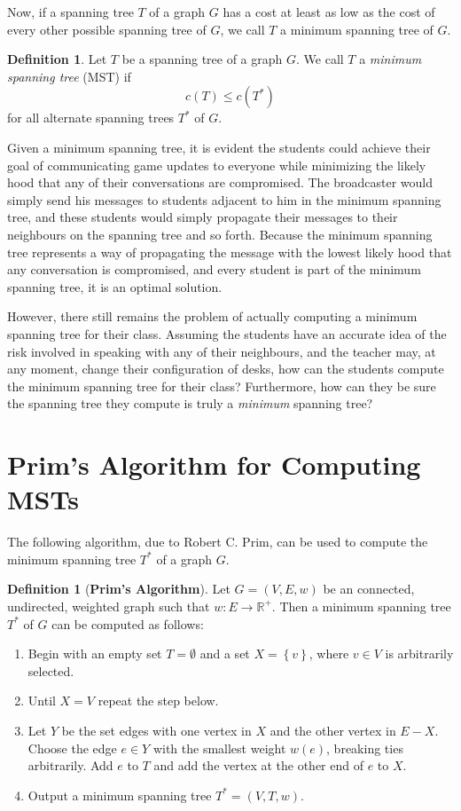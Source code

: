 \documentclass[a4paper,11pt]{report}
\theoremstyle{plain}
\theoremstyle{definition}
\newtheorem{defn}[thm]{Definition}
\begin{document}
Now, if a spanning tree $T$ of a graph $G$ has a cost at least as low as the
cost of every other possible spanning tree of $G$, we call $T$ a minimum
spanning tree of $G$.

\begin{defn} Let $T$ be a spanning tree of a graph $G$. We call $T$ a
\emph{minimum spanning tree} (MST) if
\begin{equation*}
    c(T) \leq c(T^*)
\end{equation*}
for all alternate spanning trees $T^*$ of $G$.
\end{defn}

Given a minimum spanning tree, it is evident the students could achieve their
goal of communicating game updates to everyone while minimizing the likely hood
that any of their conversations are compromised. The broadcaster would simply
send his messages to students adjacent to him in the minimum spanning tree,
and these students would simply propagate their messages to their
neighbours on the spanning tree and so forth. Because the minimum spanning
tree represents a way of propagating the message with the lowest likely
hood that any conversation is compromised, and every student is part of the
minimum spanning tree, it is an optimal solution.

However, there still remains the problem of actually computing a minimum
spanning tree for their class. Assuming the students have an accurate idea of
the risk involved in speaking with any of their neighbours, and the teacher may,
at any moment, change their configuration of desks, how can the students
compute the minimum spanning tree for their class? Furthermore, how can they
be sure the spanning tree they compute is truly a \emph{minimum} spanning tree?

\section{Prim's Algorithm for Computing MSTs}

The following algorithm, due to Robert C. Prim, can be used to compute
the minimum spanning tree $T^*$ of a graph $G$.

\begin{defn}[{\bfseries Prim's Algorithm}] Let $G = (V, E, w)$ be an
connected, undirected, weighted graph such that $w : E \to \mathbb{R}^+$.
Then a minimum spanning tree $T^*$ of $G$ can be computed as follows:
\begin{enumerate}
    \item Begin with an empty set $T = \emptyset$ and a set $X
    = \left\{v\right\}$, where $v \in V$ is arbitrarily selected.
    \item Until $X = V$ repeat the step below.
    \item Let $Y$ be the set edges with one vertex in $X$ and the other
    vertex in $E - X$. Choose the edge $e \in Y$ with the smallest weight
    $w(e)$, breaking ties arbitrarily. Add $e$ to $T$ and add the vertex at
    the other end of $e$ to $X$.
    \item Output a minimum spanning tree $T^* = (V, T, w)$.
\end{enumerate}
\end{defn}
\end{document}
